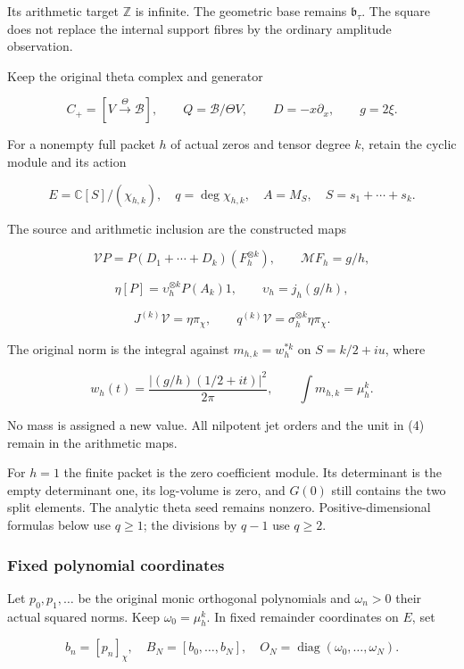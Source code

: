 \documentclass[
  11pt,
]{article}
\begin{document}
Its arithmetic target \(\mathbb Z\) is infinite. The geometric base
remains \(\mathfrak b_\tau\). The square does not replace the internal
support fibres by the ordinary amplitude observation.

Keep the original theta complex and generator

\[
 C_+=[V\xrightarrow{\Theta}\mathscr B],\qquad
 Q=\mathscr B/\Theta V,\qquad D=-x\partial_x,\qquad g=2\xi.
\]

For a nonempty full packet \(h\) of actual zeros and tensor degree
\(k\), retain the cyclic module and its action

\[
 E=\mathbb C[S]/(\chi_{h,k}),\quad q=\deg\chi_{h,k},\quad A=M_S,
 \quad S=s_1+\cdots+s_k.
\]

The source and arithmetic inclusion are the constructed maps

\[
 \mathcal VP=P(D_1+\cdots+D_k)(F_h^{\otimes k}),\qquad
 \mathcal MF_h=g/h,
\]

\[
 \eta[P]=\upsilon_h^{\otimes k}P(A_k)1,\qquad
 \upsilon_h=j_h(g/h),                                             \tag{4}
\]

\[
 J^{(k)}\mathcal V=\eta\pi_\chi,\qquad
 q^{(k)}\mathcal V=\sigma_h^{\otimes k}\eta\pi_\chi.
\]

The original norm is the integral against \(m_{h,k}=w_h^{*k}\) on
\(S=k/2+iu\), where

\[
 w_h(t)=\frac{|(g/h)(1/2+it)|^2}{2\pi},\qquad
 \int m_{h,k}=\mu_h^k.
\]

No mass is assigned a new value. All nilpotent jet orders and the unit
in (4) remain in the arithmetic maps.

For \(h=1\) the finite packet is the zero coefficient module. Its
determinant is the empty determinant one, its log-volume is zero, and
\(G(0)\) still contains the two split elements. The analytic theta seed
remains nonzero. Positive-dimensional formulas below use \(q\ge1\); the
divisions by \(q-1\) use \(q\ge2\).

\subsubsection{Fixed polynomial
coordinates}\label{fixed-polynomial-coordinates}

Let \(p_0,p_1,\ldots\) be the original monic orthogonal polynomials and
\(\omega_n>0\) their actual squared norms. Keep \(\omega_0=\mu_h^k\). In
fixed remainder coordinates on \(E\), set

\[
 b_n=[p_n]_\chi,\quad B_N=[b_0,\ldots,b_N],\quad
 O_N=\operatorname{diag}(\omega_0,\ldots,\omega_N).
\]
\end{document}
